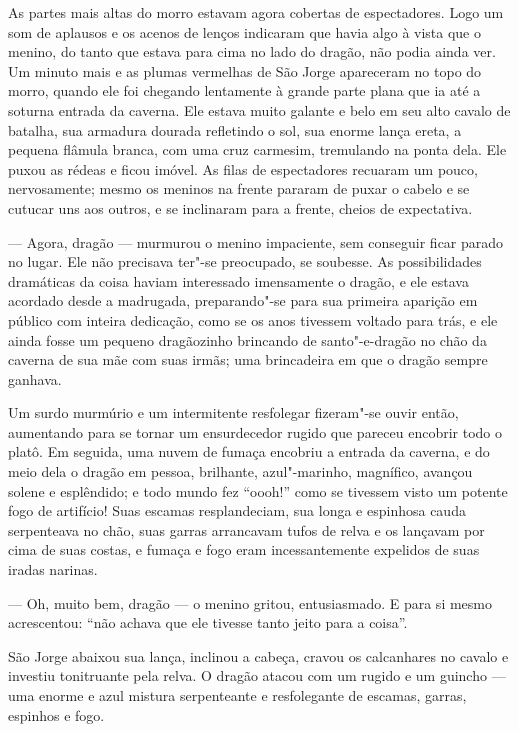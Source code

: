 As partes mais altas do morro estavam agora cobertas de espectadores.
Logo um som de aplausos e os acenos de lenços indicaram que havia
algo à vista que o menino, do tanto que estava para cima no lado do
dragão, não podia ainda ver. Um minuto mais e as plumas vermelhas de
São Jorge apareceram no topo do morro, quando ele foi chegando
lentamente à grande parte plana que ia até a soturna entrada da
caverna. Ele estava muito galante e belo em seu alto cavalo de
batalha, sua armadura dourada refletindo o sol, sua enorme lança
ereta, a pequena flâmula branca, com uma cruz carmesim, tremulando na
ponta dela. Ele puxou as rédeas e ficou imóvel. As filas de
espectadores recuaram um pouco, nervosamente; mesmo os meninos na
frente pararam de puxar o cabelo e se cutucar uns aos outros, e se
inclinaram para a frente, cheios de expectativa.

--- Agora, dragão --- murmurou o menino impaciente, sem conseguir ficar
parado no lugar. Ele não precisava ter"-se preocupado, se soubesse. As
possibilidades dramáticas da coisa haviam interessado imensamente o
dragão, e ele estava acordado desde a madrugada, preparando"-se para
sua primeira aparição em público com inteira dedicação, como se os
anos tivessem voltado para trás, e ele ainda fosse um pequeno
dragãozinho brincando de santo"-e-dragão no chão da caverna de sua mãe
com suas irmãs; uma brincadeira em que o dragão sempre ganhava.

Um surdo murmúrio e um intermitente resfolegar fizeram"-se ouvir então,
aumentando para se tornar um ensurdecedor rugido que pareceu encobrir
todo o platô. Em seguida, uma nuvem de fumaça encobriu a entrada da
caverna, e do meio dela o dragão em pessoa, brilhante, azul"-marinho,
magnífico, avançou solene e esplêndido; e todo mundo fez “oooh!” como
se tivessem visto um potente fogo de artifício! Suas escamas
resplandeciam, sua longa e espinhosa cauda serpenteava no chão, suas
garras arrancavam tufos de relva e os lançavam por cima de suas
costas, e fumaça e fogo eram incessantemente expelidos de suas iradas
narinas. 

--- Oh, muito bem, dragão --- o menino gritou, entusiasmado. E para si
mesmo acrescentou: “não achava que ele tivesse tanto jeito para a
coisa”.

São Jorge abaixou sua lança, inclinou a cabeça, cravou os calcanhares
no cavalo e investiu tonitruante pela relva. O dragão atacou com um
rugido e um guincho --- uma enorme e azul mistura serpenteante e
resfolegante de escamas, garras, espinhos e fogo.

